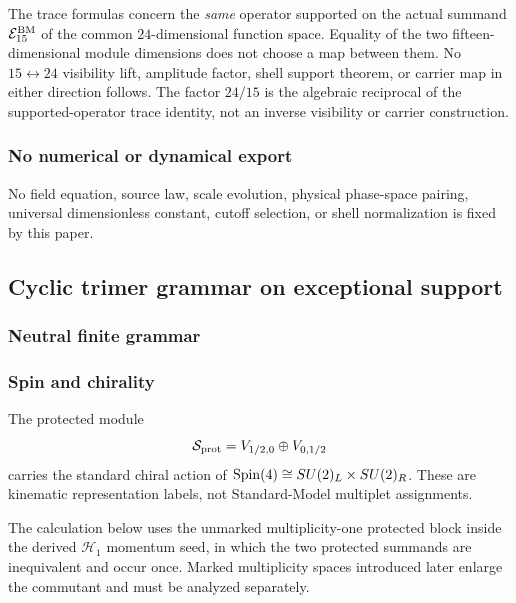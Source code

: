 \documentclass[12pt,a4paper]{article}
\begin{document}
The trace formulas concern the \emph{same} operator supported on the actual
summand \(\mathcal E_{15}^{\rm BM}\) of the common \(24\)-dimensional
function space.  Equality of the two fifteen-dimensional module dimensions
does not choose a map between them.  No \(15\leftrightarrow24\) visibility
lift, amplitude factor, shell support theorem, or carrier map in either
direction follows.  The factor \(24/15\) is the algebraic reciprocal of the
supported-operator trace identity, not an inverse visibility or carrier
construction.

\subsubsection{No numerical or dynamical export}
\label{p2:subsec:universal-remainders}

No field equation, source law, scale evolution, physical phase-space pairing,
universal dimensionless constant, cutoff selection, or shell normalization is
fixed by this paper.


\label{p2:part:kin-sm}
\label{p2:part:internal-symmetry-handoffs}


\subsection{Cyclic trimer grammar on exceptional support}
\label{paper2e:sec:organized-grammar}

\subsubsection{Neutral finite grammar}
\label{p2:sec:kin-sm-internal}

\subsubsection{Spin and chirality}
\label{p2:subsec:kin-spin-chirality}

The protected module
\[
        \mathcal S_{\rm prot}
        =V_{1/2,0}\oplus V_{0,1/2}
\]
carries the standard chiral action of
\(\mathrm{Spin}(4)\cong SU(2)_L\times SU(2)_R\).  These are kinematic
representation labels, not Standard-Model multiplet assignments.

\begin{remark}
\label{p2:rem:kin-f-envelope-sync}
The calculation below uses the unmarked multiplicity-one protected block inside the derived \(\mathcal H_1\) momentum seed, in which the two
protected summands are inequivalent and occur once.  Marked multiplicity
spaces introduced later enlarge the commutant and must be analyzed
separately.
\end{remark}
\end{document}
